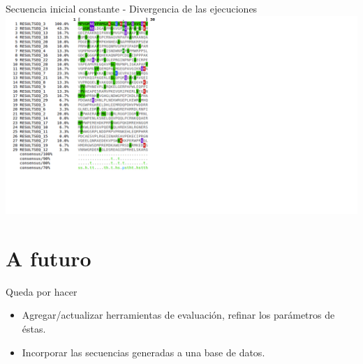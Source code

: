\documentclass{beamer}
\begin{document}
\begin{frame}{Secuencia inicial constante - Divergencia de las ejecuciones}
\includegraphics[width=1.5\textwidth,height=1.1\textheight]{divergencia.png}
\end{frame}

\section{A futuro}

\begin{frame}{Queda por hacer}
\begin{itemize}
\item Agregar/actualizar herramientas de evaluación, refinar los parámetros de éstas. 
\item Incorporar las secuencias generadas a una base de datos. 
\end{itemize}
\end{frame}	
\end{document}
